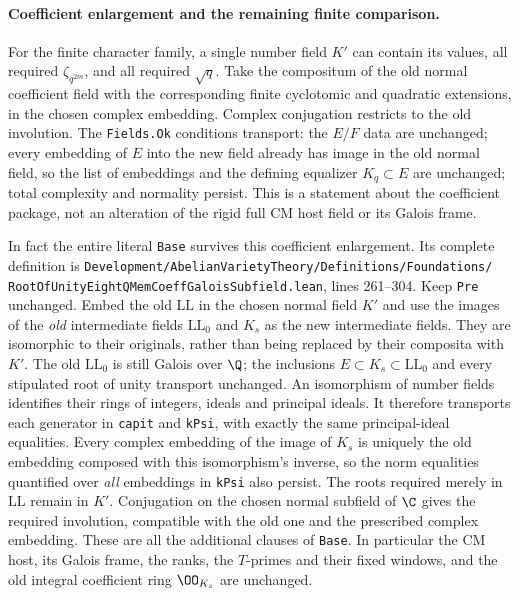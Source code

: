\paragraph{Coefficient enlargement and the remaining finite comparison.}
For the finite character family, a single number field
$K'$ can contain its values, all required
$\zeta_{q^{2m}}$, and all required $\sqrt q$.
Take the compositum of the old normal coefficient field
with the corresponding finite cyclotomic and quadratic
extensions, in the chosen complex embedding.  Complex
conjugation restricts to the old involution.  The
\texttt{Fields.Ok} conditions transport: the $E/F$ data
are unchanged; every embedding of $E$ into the new field
already has image in the old normal field, so the list
of embeddings and the defining equalizer $K_q\subset E$
are unchanged; total complexity and normality persist.
This is a statement about the coefficient package, not
an alteration of the rigid full CM host field or its
Galois frame.

In fact the entire literal \texttt{Base} survives this
coefficient enlargement.  Its complete definition is
\texttt{Development/AbelianVarietyTheory/Definitions/Foundations/}
\texttt{RootOfUnityEightQMemCoeffGaloisSubfield.lean},
lines 261--304.  Keep \texttt{Pre} unchanged.  Embed the
old $\mathrm{LL}$ in the chosen normal field $K'$ and
use the images of the \emph{old} intermediate fields
$\mathrm{LL}_0$ and $K_s$ as the new intermediate fields.
They are isomorphic to their originals, rather than
being replaced by their composita with $K'$.
The old $\mathrm{LL}_0$ is still Galois over $\Q$;
the inclusions $E\subset K_s\subset\mathrm{LL}_0$
and every stipulated root of unity transport unchanged.
An isomorphism of number fields identifies their rings
of integers, ideals and principal ideals.  It therefore
transports each generator in \texttt{capit} and
\texttt{kPsi}, with exactly the same principal-ideal
equalities.  Every complex embedding of the image of
$K_s$ is uniquely the old embedding composed with this
isomorphism's inverse, so the norm equalities quantified
over \emph{all} embeddings in \texttt{kPsi} also persist.
The roots required merely in $\mathrm{LL}$ remain in
$K'$.  Conjugation on the chosen normal subfield of
$\C$ gives the required involution, compatible with
the old one and the prescribed complex embedding.
These are all the additional clauses of \texttt{Base}.
In particular the CM host, its Galois frame, the ranks,
the $T$-primes and their fixed windows, and the old
integral coefficient ring $\OO_{K_s}$ are unchanged.

